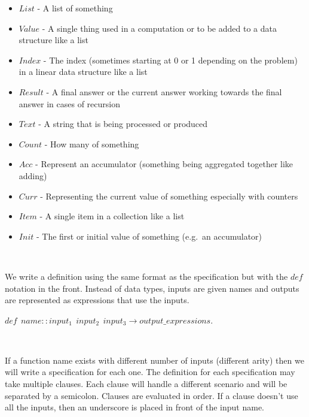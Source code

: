 \documentclass[
]{book}
\providecommand{\tightlist}{%
  \setlength{\itemsep}{0pt}\setlength{\parskip}{0pt}}
\begin{document}
\begin{formulabox}
\begin{itemize}
  \begin{itemize}
  \tightlist
  \item
    \(List\) - A list of something
  \item
    \(Value\) - A single thing used in a computation or to be added to a data structure like a list
  \item
    \(Index\) - The index (sometimes starting at 0 or 1 depending on the problem) in a linear data structure like a list
  \item
    \(Result\) - A final answer or the current answer working towards the final answer in cases of recursion
  \item
    \(Text\) - A string that is being processed or produced
  \item
    \(Count\) - How many of something
  \item
    \(Acc\) - Represent an accumulator (something being aggregated together like adding)
  \item
    \(Curr\) - Representing the current value of something especially with counters
  \item
    \(Item\) - A single item in a collection like a list
  \item
    \(Init\) - The first or initial value of something (e.g.~an accumulator)
  \end{itemize}
\end{itemize}

\end{formulabox}

\(\nonumber\)

We write a definition using the same format as the specification but with the \(\mathit{def}\) notation in the front. Instead of data types, inputs are given names and outputs are represented as expressions that use the inputs.

\begin{formulabox}
\(de\mathit{f} ~ ~ name :: input_1 ~ ~ input_2 ~ ~ input_3 \rightarrow output\_expressions.\)

\end{formulabox}

\(\nonumber\)

If a function name exists with different number of inputs (different arity) then we will write a specification for each one. The definition for each specification may take multiple clauses. Each clause will handle a different scenario and will be separated by a semicolon. Clauses are evaluated in order. If a clause doesn't use all the inputs, then an underscore is placed in front of the input name.
\end{document}
